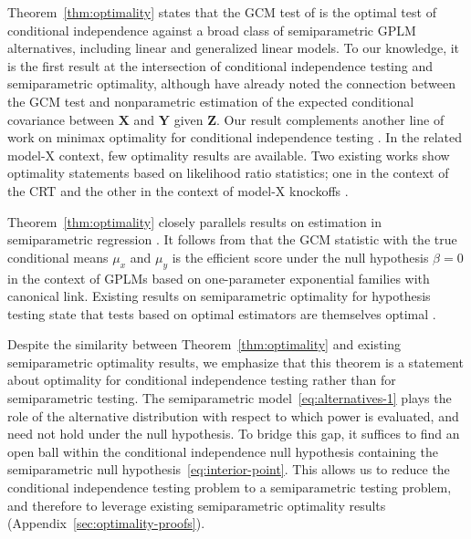 \documentclass[aos]{imsart}
\theoremstyle{plain}
\theoremstyle{remark}
\newcommand{\prx}{\bm X}								%
\newcommand{\prz}{\bm Z}								%
\newcommand{\pry}{{\bm Y}}								%
\begin{document}
Theorem~\ref{thm:optimality} states that the GCM test of \citet{Shah2018} is the optimal test of conditional independence against a broad class of semiparametric GPLM alternatives, including linear and generalized linear models. To our knowledge, it is the first result at the intersection of conditional independence testing and semiparametric optimality, although \citet{Shah2018} have already noted the connection between the GCM test and nonparametric estimation of the expected conditional covariance between $\prx$ and $\pry$ given $\prz$. Our result complements another line of work on minimax optimality for conditional independence testing \citep{Canonne2018, Neykov2021, Kim2021}. In the related model-X context, few optimality results are available. Two existing works show optimality statements based on likelihood ratio statistics; one in the context of the CRT \citep{Katsevich2020a} and the other in the context of model-X knockoffs \citep{Spector2022a}.

Theorem~\ref{thm:optimality} closely parallels results on estimation in semiparametric regression \citep{Robinson1988, Bickel1993,Donald1994, Hardle2000, Robins2001, VanDeGeer2014, Ning2017, Jankova2018a, Chernozhukov2018}. It follows from \citet{Bickel1993, Robins2001} that the GCM statistic with the true conditional means $\mu_x$ and $\mu_y$ is the efficient score under the null hypothesis $\beta = 0$ in the context of GPLMs based on one-parameter exponential families with canonical link. Existing results on semiparametric optimality for hypothesis testing state that tests based on optimal estimators are themselves optimal \citep{Choi1996, VDV1998, Kosorok2008}.

Despite the similarity between Theorem~\ref{thm:optimality} and existing semiparametric optimality results, we emphasize that this theorem is a statement about optimality for conditional independence testing rather than for semiparametric testing. The semiparametric model~\eqref{eq:alternatives-1} plays the role of the alternative distribution with respect to which power is evaluated, and need not hold under the null hypothesis. To bridge this gap, it suffices to find an open ball within the conditional independence null hypothesis containing the semiparametric null hypothesis~\eqref{eq:interior-point}. This allows us to reduce the conditional independence testing problem to a semiparametric testing problem, and therefore to leverage existing semiparametric optimality results (Appendix~\ref{sec:optimality-proofs}).
\end{document}
